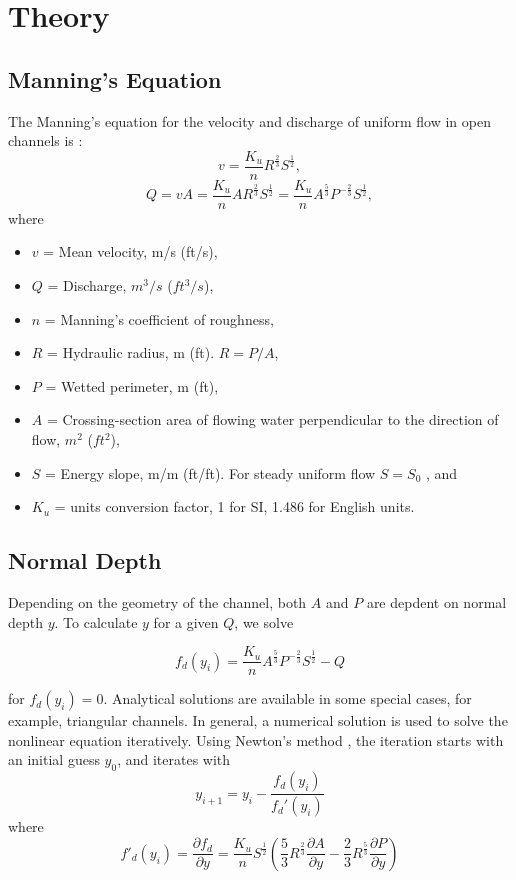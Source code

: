 \section{Theory}
\subsection{Manning's Equation}
The Manning's equation for the velocity and discharge of uniform flow in open channels is \cite{Chow1959,French1985,hds4,Munson2013}:
\begin{equation}  
v = \frac{K_u}{n}R^{\frac{2}{3}}S^{\frac{1}{2}},
\label{Eq:v}
\end{equation}
\begin{equation}  
Q = vA = \frac{K_u}{n}AR^{\frac{2}{3}}S^{\frac{1}{2}}=\frac{K_u}{n}A^{\frac{5}{3}}P^{-\frac{2}{3}}S^{\frac{1}{2}},
\label{Eq:Q}
\end{equation}
where
\begin{itemize}
\item[] $v$ = Mean velocity, m/s (ft/s),
\item[] $Q$ = Discharge, $m^3/s$ ($ft^3/s$),
\item[] $n$ = Manning's coefficient of roughness,
\item[] $R$ = Hydraulic radius, m (ft). $R = P/A$,
\item [] $P$ = Wetted perimeter, m (ft),
\item [] $A$ = Crossing-section area of flowing water perpendicular to the direction of flow, $m^2$ ($ft^2$),
\item[] $S$ = Energy slope, m/m (ft/ft). For steady uniform flow $S=S_0$ , and
\item[] $K_u$ = units conversion factor, 1 for SI, 1.486 for English units.
\end{itemize}

\subsection{Normal Depth}
Depending on the geometry of the channel, both $A$ and $P$ are depdent on normal depth $y$. To calculate $y$ for a given $Q$, we solve 

\begin{equation}  
f_d(y_{i})= \frac{K_u}{n}A^{\frac{5}{3}}P^{-\frac{2}{3}}S^{\frac{1}{2}} - Q 
\end{equation}

\noindent for $f_d(y_{i}) = 0$. Analytical solutions are available in some special cases, for example, triangular channels. In general, a numerical solution is used to solve the nonlinear equation iteratively. Using Newton's method \cite{Strang1991}, the iteration starts with an initial guess $y_0$, and iterates with
\begin{equation}  
y_{i+1} = y_i -\frac{f_d(y_{i})}{f_d'(y_{i})}
\end{equation}
where
\begin{equation}  
f'_d(y_{i})=\frac{\partial f_d}{\partial y}= \frac{K_u}{n}S^{\frac{1}{2}}\left(\frac{5}{3}R^{\frac{2}{3}}\frac{\partial A}{\partial y} -  \frac{2}{3}R^{\frac{5}{3}}\frac{\partial P}{\partial y}\right)
\end{equation}

